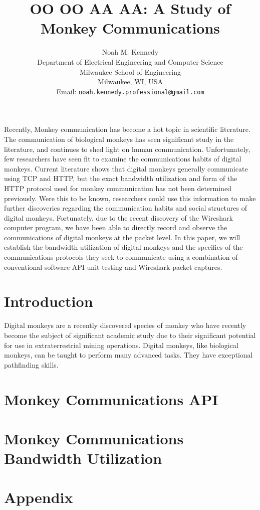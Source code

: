 \documentclass[11pt]{article}
\title{
    OO OO AA AA: A Study of Monkey Communications
}
\author{
    Noah M. Kennedy \\[3pt]
    {\small Department of Electrical Engineering and Computer Science} \\
    {\small Milwaukee School of Engineering} \\
    {\small Milwaukee, WI, USA} \\
    {\small Email: {\tt noah.kennedy.professional@gmail.com}} \\[12pt]
}
\date{}
\begin{document}
    \maketitle

    \abstract
    Recently, Monkey communication has become a hot topic in scientific literature.
    The communication of biological monkeys has seen significant study in the literature,
    and continues to shed light on human communication.
    Unfortunately, few researchers have seen fit to examine the communications habits of digital
    monkeys.
    Current literature\cite{sub_verif_plan} shows that digital monkeys generally communicate using
    TCP and HTTP, but the exact bandwidth utilization and form of the HTTP protocol used for monkey
    communication has not been determined previously.
    Were this to be known, researchers could use this information to make further discoveries
    regarding the communication habits and social structures of digital monkeys.
    Fortunately, due to the recent discovery of the Wireshark computer program, we have been able
    to directly record and observe the communications of digital monkeys at the packet level.
    In this paper, we will establish the bandwidth utilization of digital monkeys and the specifics
    of the communications protocols they seek to communicate using a combination of conventional
    software API unit testing and Wireshark packet captures.

    \newpage

    \tableofcontents

    \newpage


    \section{Introduction} \label{sec:intro}
    Digital monkeys are a recently discovered species of monkey who have recently become the
    subject of significant academic study due to their significant potential for use in
    extraterrestrial mining operations.
    Digital monkeys, like biological monkeys, can be taught to perform many advanced tasks.
    They have exceptional pathfinding skills.


    \section{Monkey Communications API}\label{sec:api}

    \section{Monkey Communications Bandwidth Utilization}\label{sec:bandwidth}

    \section*{Appendix}\label{sec:appendix}

    \pagebreak

    \printbibliography
\end{document}
